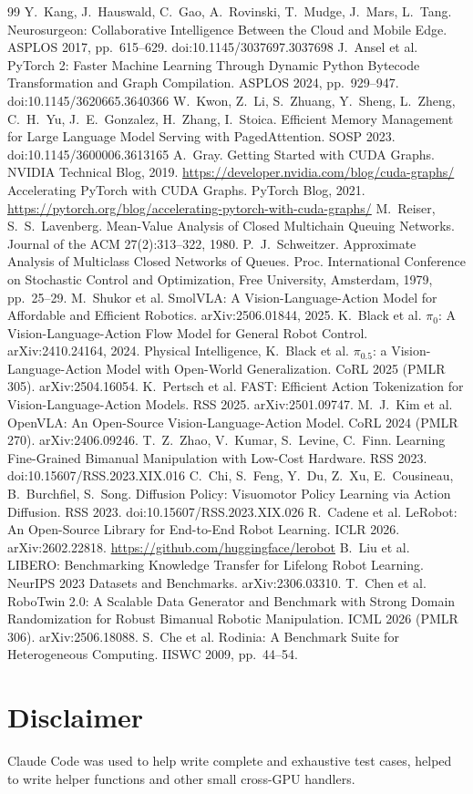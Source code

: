 \documentclass[10pt,twocolumn]{article}
\begin{document}
\begin{thebibliography}{99}
 Y.~Kang, J.~Hauswald, C.~Gao, A.~Rovinski, T.~Mudge, J.~Mars, L.~Tang.
Neurosurgeon: Collaborative Intelligence Between the Cloud and Mobile Edge. ASPLOS 2017,
pp.~615--629. doi:10.1145/3037697.3037698
 J.~Ansel et al. PyTorch 2: Faster Machine Learning Through Dynamic Python
Bytecode Transformation and Graph Compilation. ASPLOS 2024, pp.~929--947.
doi:10.1145/3620665.3640366
 W.~Kwon, Z.~Li, S.~Zhuang, Y.~Sheng, L.~Zheng, C.~H.~Yu, J.~E.~Gonzalez,
H.~Zhang, I.~Stoica. Efficient Memory Management for Large Language Model Serving with
PagedAttention. SOSP 2023. doi:10.1145/3600006.3613165
 A.~Gray. Getting Started with CUDA Graphs. NVIDIA Technical Blog, 2019.
\url{https://developer.nvidia.com/blog/cuda-graphs/}
 Accelerating PyTorch with CUDA Graphs. PyTorch Blog, 2021.
\url{https://pytorch.org/blog/accelerating-pytorch-with-cuda-graphs/}
 M.~Reiser, S.~S.~Lavenberg. Mean-Value Analysis of Closed Multichain Queuing
Networks. Journal of the ACM 27(2):313--322, 1980.
 P.~J.~Schweitzer. Approximate Analysis of Multiclass Closed Networks of
Queues. Proc. International Conference on Stochastic Control and Optimization, Free
University, Amsterdam, 1979, pp.~25--29.
 M.~Shukor et al. SmolVLA: A Vision-Language-Action Model for Affordable and
Efficient Robotics. arXiv:2506.01844, 2025.
 K.~Black et al. $\pi_0$: A Vision-Language-Action Flow Model for General Robot
Control. arXiv:2410.24164, 2024.
 Physical Intelligence, K.~Black et al. $\pi_{0.5}$: a Vision-Language-Action
Model with Open-World Generalization. CoRL 2025 (PMLR 305). arXiv:2504.16054.
 K.~Pertsch et al. FAST: Efficient Action Tokenization for Vision-Language-Action
Models. RSS 2025. arXiv:2501.09747.
 M.~J.~Kim et al. OpenVLA: An Open-Source Vision-Language-Action Model.
CoRL 2024 (PMLR 270). arXiv:2406.09246.
 T.~Z.~Zhao, V.~Kumar, S.~Levine, C.~Finn. Learning Fine-Grained Bimanual
Manipulation with Low-Cost Hardware. RSS 2023. doi:10.15607/RSS.2023.XIX.016
 C.~Chi, S.~Feng, Y.~Du, Z.~Xu, E.~Cousineau, B.~Burchfiel, S.~Song.
Diffusion Policy: Visuomotor Policy Learning via Action Diffusion. RSS 2023.
doi:10.15607/RSS.2023.XIX.026
 R.~Cadene et al. LeRobot: An Open-Source Library for End-to-End Robot
Learning. ICLR 2026. arXiv:2602.22818. \url{https://github.com/huggingface/lerobot}
 B.~Liu et al. LIBERO: Benchmarking Knowledge Transfer for Lifelong Robot
Learning. NeurIPS 2023 Datasets and Benchmarks. arXiv:2306.03310.
 T.~Chen et al. RoboTwin 2.0: A Scalable Data Generator and Benchmark with
Strong Domain Randomization for Robust Bimanual Robotic Manipulation. ICML 2026 (PMLR 306).
arXiv:2506.18088.
 S.~Che et al. Rodinia: A Benchmark Suite for Heterogeneous Computing. IISWC
2009, pp.~44--54.
\end{thebibliography}

\section*{Disclaimer}
Claude Code was used to help write complete and exhaustive test cases, helped to write helper
functions and other small cross-GPU handlers.
\end{document}
